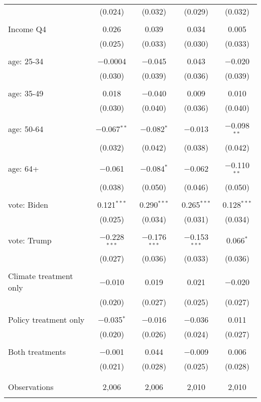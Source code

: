 \begin{tabular}{@{\extracolsep{5pt}}lcccc}
  & (0.024) & (0.032) & (0.029) & (0.032) \\ 
  & & & & \\ 
 Income Q4 & 0.026 & 0.039 & 0.034 & 0.005 \\ 
  & (0.025) & (0.033) & (0.030) & (0.033) \\ 
  & & & & \\ 
 age: 25-34 & $-$0.0004 & $-$0.045 & 0.043 & $-$0.020 \\ 
  & (0.030) & (0.039) & (0.036) & (0.039) \\ 
  & & & & \\ 
 age: 35-49 & 0.018 & $-$0.040 & 0.009 & 0.010 \\ 
  & (0.030) & (0.040) & (0.036) & (0.040) \\ 
  & & & & \\ 
 age: 50-64 & $-$0.067$^{**}$ & $-$0.082$^{*}$ & $-$0.013 & $-$0.098$^{**}$ \\ 
  & (0.032) & (0.042) & (0.038) & (0.042) \\ 
  & & & & \\ 
 age: 64+ & $-$0.061 & $-$0.084$^{*}$ & $-$0.062 & $-$0.110$^{**}$ \\ 
  & (0.038) & (0.050) & (0.046) & (0.050) \\ 
  & & & & \\ 
 vote: Biden & 0.121$^{***}$ & 0.290$^{***}$ & 0.265$^{***}$ & 0.128$^{***}$ \\ 
  & (0.025) & (0.034) & (0.031) & (0.034) \\ 
  & & & & \\ 
 vote: Trump & $-$0.228$^{***}$ & $-$0.176$^{***}$ & $-$0.153$^{***}$ & 0.066$^{*}$ \\ 
  & (0.027) & (0.036) & (0.033) & (0.036) \\ 
  & & & & \\ 
 Climate treatment only & $-$0.010 & 0.019 & 0.021 & $-$0.020 \\ 
  & (0.020) & (0.027) & (0.025) & (0.027) \\ 
  & & & & \\ 
 Policy treatment only & $-$0.035$^{*}$ & $-$0.016 & $-$0.036 & 0.011 \\ 
  & (0.020) & (0.026) & (0.024) & (0.027) \\ 
  & & & & \\ 
 Both treatments & $-$0.001 & 0.044 & $-$0.009 & 0.006 \\ 
  & (0.021) & (0.028) & (0.025) & (0.028) \\ 
  & & & & \\ 
\hline \\[-1.8ex] 

Observations & 2,006 & 2,006 & 2,010 & 2,010 \\ 
\hline 
\hline \\[-1.8ex] 
\end{tabular} 